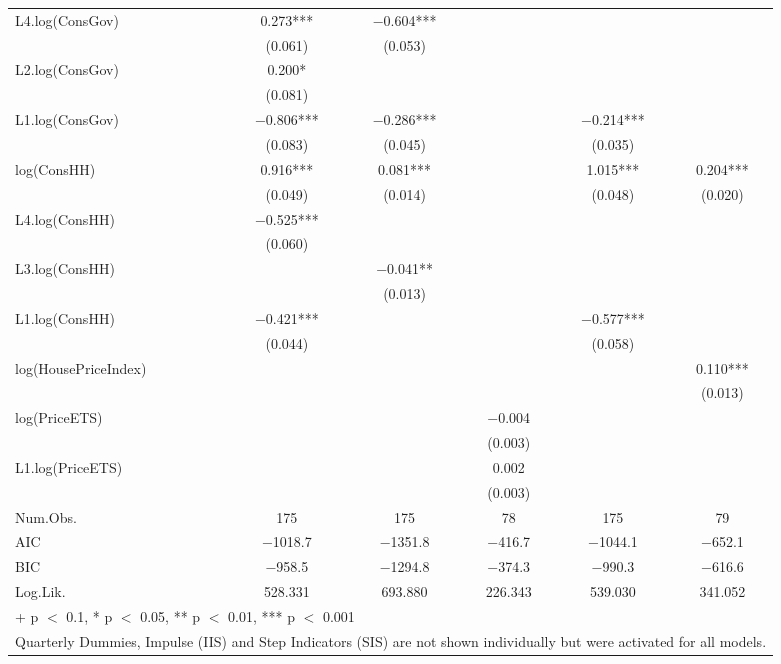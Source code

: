 \begin{table}
{\begin{tabular}[t]{lccccc}
L4.log(ConsGov) & \num{0.273}*** & \num{-0.604}*** &  &  & \\
 & (\num{0.061}) & (\num{0.053}) &  &  & \\
L2.log(ConsGov) & \num{0.200}* &  &  &  & \\
 & (\num{0.081}) &  &  &  & \\
L1.log(ConsGov) & \num{-0.806}*** & \num{-0.286}*** &  & \num{-0.214}*** & \\
 & (\num{0.083}) & (\num{0.045}) &  & (\num{0.035}) & \\
log(ConsHH) & \num{0.916}*** & \num{0.081}*** &  & \num{1.015}*** & \num{0.204}***\\
 & (\num{0.049}) & (\num{0.014}) &  & (\num{0.048}) & (\num{0.020})\\
L4.log(ConsHH) & \num{-0.525}*** &  &  &  & \\
 & (\num{0.060}) &  &  &  & \\
L3.log(ConsHH) &  & \num{-0.041}** &  &  & \\
 &  & (\num{0.013}) &  &  & \\
L1.log(ConsHH) & \num{-0.421}*** &  &  & \num{-0.577}*** & \\
 & (\num{0.044}) &  &  & (\num{0.058}) & \\
log(HousePriceIndex) &  &  &  &  & \num{0.110}***\\
 &  &  &  &  & (\num{0.013})\\
log(PriceETS) &  &  & \num{-0.004} &  & \\
 &  &  & (\num{0.003}) &  \vphantom{1} & \\
L1.log(PriceETS) &  &  & \num{0.002} &  & \\
 &  &  & (\num{0.003}) &  & \\
\midrule
Num.Obs. & \num{175} & \num{175} & \num{78} & \num{175} & \num{79}\\
AIC & \num{-1018.7} & \num{-1351.8} & \num{-416.7} & \num{-1044.1} & \num{-652.1}\\
BIC & \num{-958.5} & \num{-1294.8} & \num{-374.3} & \num{-990.3} & \num{-616.6}\\
Log.Lik. & \num{528.331} & \num{693.880} & \num{226.343} & \num{539.030} & \num{341.052}\\
\bottomrule
\multicolumn{6}{l}{\rule{0pt}{1em}+ p $<$ 0.1, * p $<$ 0.05, ** p $<$ 0.01, *** p $<$ 0.001}\\
\multicolumn{6}{l}{\rule{0pt}{1em}Quarterly Dummies, Impulse (IIS) and Step Indicators (SIS) are not shown individually but were activated for all models.}\\
\end{tabular}}
\end{table}
